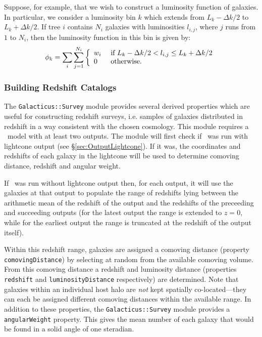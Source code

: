 Suppose, for example, that we wish to construct a luminosity function of galaxies. In particular, we consider a luminosity bin $k$ which extends from $L_k-\Delta k/2$ to $L_k+\Delta k/2$. If tree $i$ contains $N_i$ galaxies with luminosities $l_{i,j}$, where $j$ runs from $1$ to $N_i$, then the luminosity function in this bin is given by:
\begin{equation}
 \phi_k = \sum_i \sum_{j=1}^{N_i} \left\{ \begin{array}{ll} w_i & \hbox{ if  } L_k-\Delta k/2 < l_{i,j} \le L_k+\Delta k/2 \\ 0 & \hbox{ otherwise.} \end{array} \right.
\end{equation}

\subsubsection{Building Redshift Catalogs}\label{sec:Galacticus::Survey}

The {\tt Galacticus::Survey} module provides several derived properties which are useful for constructing redshift surveys, i.e. samples of galaxies distributed in redshift in a way consistent with the chosen cosmology. This module requires a \glc\ model with at least two outputs. The module will first check if \glc\ was run with lightcone output (see \S\ref{sec:OutputLightcone}). If it was, the coordinates and redshifts of each galaxy in the lightcone will be used to determine comoving distance, redshift and angular weight.

If \glc\ was run without lightcone output then, for each output, it will use the galaxies at that output to populate the range of redshifts lying between the arithmetic mean of the redshift of the output and the redshifts of the preceeding and succeeding outputs (for the latest output the range is extended to $z=0$, while for the earliest output the range is truncated at the redshift of the output itself).

Within this redshift range, galaxies are assigned a comoving distance (property {\tt comovingDistance}) by selecting at random from the available comoving volume. From this comoving distance a redshift and luminosity distance (properties {\tt redshift} and {\tt luminosityDistance} respectively) are determined. Note that galaxies within an individual host halo are \emph{not} kept spatially co-located---they can each be assigned different comoving distances within the available range. In addition to these properties, the {\tt Galacticus::Survey} module provides a {\tt angularWeight} property. This gives the mean number of each galaxy that would be found in a solid angle of one steradian.

